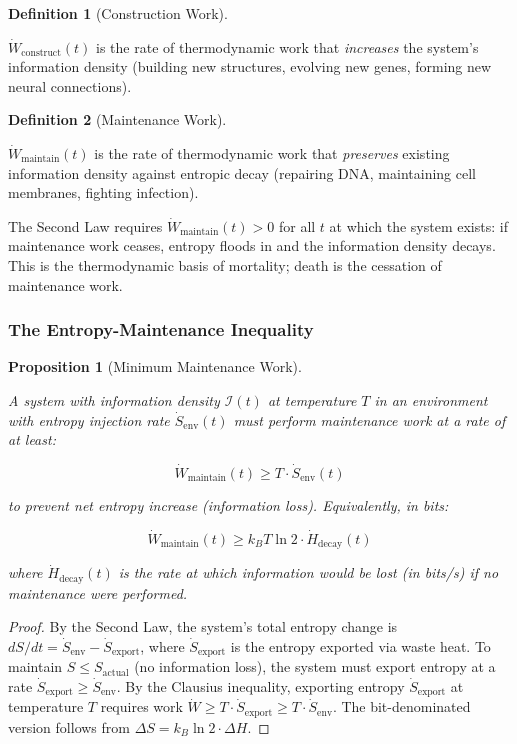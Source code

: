 \documentclass[11pt]{article}
\theoremstyle{plain}
\newtheorem{proposition}[theorem]{Proposition}
\theoremstyle{definition}
\newtheorem{definition}{Definition}
\theoremstyle{remark}
\let\origsubsubsection\subsubsection
\renewcommand{\subsubsection}{\needspace{4\baselineskip}\origsubsubsection}
\begin{document}
\begin{definition}[Construction Work]
\label{def-construction-work}

$\dot{W}_{\text{construct}}(t)$ is the rate of thermodynamic work that \emph{increases} the system's information density (building new structures, evolving new genes, forming new neural connections).
\end{definition}

\begin{definition}[Maintenance Work]
\label{def-maintenance-work}

$\dot{W}_{\text{maintain}}(t)$ is the rate of thermodynamic work that \emph{preserves} existing information density against entropic decay (repairing DNA, maintaining cell membranes, fighting infection).
\end{definition}

The Second Law requires \(\dot{W}_{\text{maintain}}(t) > 0\) for all
\(t\) at which the system exists: if maintenance work ceases, entropy
floods in and the information density decays. This is the thermodynamic
basis of mortality; death is the cessation of maintenance work.

\subsubsection{The Entropy-Maintenance
Inequality}\label{the-entropy-maintenance-inequality}

\begin{proposition}[Minimum Maintenance Work]
\label{prop-minimum-maintenance-work}

A system with information density $\mathcal{I}(t)$ at temperature $T$ in an environment with entropy injection rate $\dot{S}_{\text{env}}(t)$ must perform maintenance work at a rate of at least:

$$\dot{W}_{\text{maintain}}(t) \geq T \cdot \dot{S}_{\text{env}}(t)$$

to prevent net entropy increase (information loss). Equivalently, in bits:

$$\dot{W}_{\text{maintain}}(t) \geq k_B T \ln 2 \cdot \dot{H}_{\text{decay}}(t)$$

where $\dot{H}_{\text{decay}}(t)$ is the rate at which information would be lost (in bits/s) if no maintenance were performed.
\end{proposition}

\begin{proof}
By the Second Law, the system's total entropy change is $dS/dt = \dot{S}_{\text{env}} - \dot{S}_{\text{export}}$, where $\dot{S}_{\text{export}}$ is the entropy exported via waste heat. To maintain $S \leq S_{\text{actual}}$ (no information loss), the system must export entropy at a rate $\dot{S}_{\text{export}} \geq \dot{S}_{\text{env}}$. By the Clausius inequality, exporting entropy $\dot{S}_{\text{export}}$ at temperature $T$ requires work $\dot{W} \geq T \cdot \dot{S}_{\text{export}} \geq T \cdot \dot{S}_{\text{env}}$. The bit-denominated version follows from $\Delta S = k_B \ln 2 \cdot \Delta H$.
\end{proof}
\end{document}

